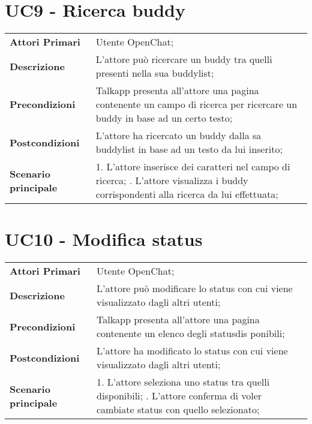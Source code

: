 \section{UC9 - Ricerca buddy}
	\begin{center}
	\bgroup
	\def\arraystretch{1.8}     
	\begin{longtable}{  p{4cm} | p{9.5cm} } 
		\textbf{Attori Primari} & Utente OpenChat; \\ 
		\textbf{Descrizione} &  L'attore può ricercare un  buddy tra quelli presenti nella sua buddylist; \\ 
		\textbf{Precondizioni}  & Talkapp presenta all'attore una pagina contenente un campo di ricerca per ricercare un buddy in base ad un certo testo; \\
		\textbf{Postcondizioni} & L'attore ha ricercato un buddy dalla sa buddylist in base ad un testo da lui inserito;  \\ 
		\textbf{Scenario principale} & 
		1. L'attore inserisce dei caratteri nel campo di ricerca; \newline
		2. L'attore visualizza i buddy corrispondenti alla ricerca da lui effettuata;
	\end{longtable}
	\egroup
\end{center}

\section{UC10 - Modifica status}
	\begin{center}
	\bgroup
	\def\arraystretch{1.8}     
	\begin{longtable}{  p{4cm} | p{9.5cm} } 
		\textbf{Attori Primari} & Utente OpenChat; \\ 
		\textbf{Descrizione} &  L'attore può modificare lo status con cui viene visualizzato dagli altri utenti; \\ 
		\textbf{Precondizioni}  & Talkapp presenta all'attore una pagina contenente un elenco degli statusdis ponibili; \\
		\textbf{Postcondizioni} & L'attore ha modificato lo status con cui viene visualizzato dagli altri utenti; \\ 
		\textbf{Scenario principale} & 
		1. L'attore seleziona uno status tra quelli disponibili; \newline
		2. L'attore conferma di voler cambiate status con quello selezionato;
	\end{longtable}
	\egroup
\end{center}

